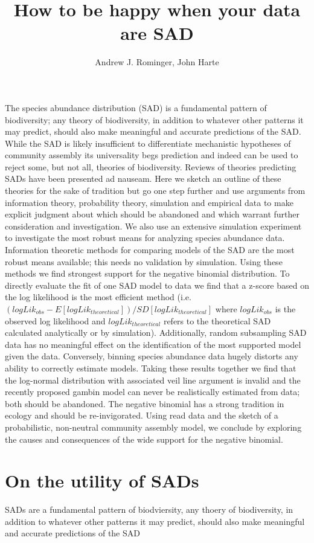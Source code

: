 \documentclass[12pt]{article}
\title{How to be happy when your data are SAD}
\author{Andrew J. Rominger, John Harte}
\begin{document}
\maketitle

The species abundance distribution (SAD) is a fundamental pattern of
biodiversity; any theory of biodiversity, in addition to whatever
other patterns it may predict, should also make meaningful and
accurate predictions of the SAD. While the SAD is likely insufficient
to differentiate mechanistic hypotheses of community assembly its
universality begs prediction and indeed can be used to reject some,
but not all, theories of biodiversity. Reviews of theories predicting
SADs have been presented ad nauseam. Here we sketch an outline of
these theories for the sake of tradition but go one step further and
use arguments from information theory, probability theory, simulation
and empirical data to make explicit judgment about which should be
abandoned and which warrant further consideration and
investigation. We also use an extensive simulation experiment to
investigate the most robust means for analyzing species abundance
data. Information theoretic methods for comparing models of the SAD
are the most robust means available; this needs no validation by
simulation. Using these methods we find strongest support for the
negative binomial distribution. To directly evaluate the fit of one
SAD model to data we find that a z-score based on the log likelihood
is the most efficient method (i.e. $(logLik_{obs} -
E[logLik_{theoretical}]) / SD[logLik_{theoretical}]$ where $logLik_{obs}$ is
the observed log likelihood and $logLik_{theoretical}$ refers to the
theoretical SAD calculated analytically or by
simulation). Additionally, random subsampling SAD data has no
meaningful effect on the identification of the most supported model
given the data. Conversely, binning species abundance data hugely
distorts any ability to correctly estimate models.  Taking these
results together we find that the log-normal distribution with
associated veil line argument is invalid and the recently proposed
gambin model can never be realistically estimated from data; both
should be abandoned.  The negative binomial has a strong tradition in
ecology and should be re-invigorated.  Using read data and the sketch
of a probabilistic, non-neutral community assembly model, we conclude
by exploring the causes and consequences of the wide support for the
negative binomial.


\section{On the utility of SADs}
SADs are a fundamental pattern of biodviersity, any thoery of
biodiversity, in addition to whatever other patterns it may predict,
should also make meaningful and accurate predictions of the SAD
\end{document}
